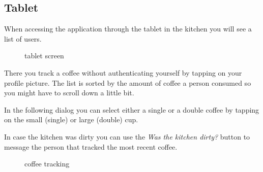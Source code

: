\subsection{Tablet}\label{tablet}

When accessing the application through the tablet in the kitchen you
will see a list of users.

\begin{figure}[htbp]
\centering
{}
\caption{tablet screen}
\end{figure}

There you track a coffee without authenticating yourself by tapping on
your profile picture. The list is sorted by the amount of coffee a
person consumed so you might have to scroll down a little bit.

In the following dialog you can select either a single or a double
coffee by tapping on the small (single) or large (double) cup.

In case the kitchen was dirty you can use the \emph{Was the kitchen
dirty?} button to message the person that tracked the most recent
coffee.

\begin{figure}[htbp]
\centering
{}
\caption{coffee tracking}
\end{figure}

